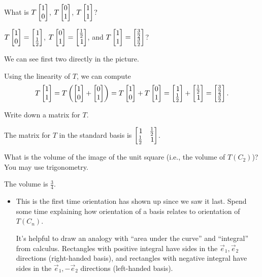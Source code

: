 \documentclass{problemset}
\newcommand{\bookonlynewpage}{\begin{bookonly}\newpage\end{bookonly}}
\begin{document}
	\begin{parts}
		\item What is $T\mat{1\\0}$, $T\mat{0\\1}$, $T\mat{1\\1}$?
			\begin{solution}
				$T\mat{1\\0}=\mat{1\\\frac{1}{2}}$,
				$T\mat{0\\1}=\mat{\frac{1}{2}\\1}$, and
				$T\mat{1\\1}=\mat{\frac{3}{2}\\\frac{3}{2}}$?

				We can see first two directly in the picture.

				Using the linearity of $T$, we can compute
				\[
					T\mat{1\\1}
					=T\left(\mat{1\\0}+\mat{0\\1}\right)
					=T\mat{1\\0}+T\mat{0\\1}
					=\mat{1\\\frac{1}{2}}+\mat{\frac{1}{2}\\1}
					=\mat{\frac{3}{2}\\\frac{3}{2}}.
				\]

			\end{solution}
		\item Write down a matrix for $T$.
			\begin{solution}
				The matrix for $T$ in the standard basis is
				$\mat{1&\frac{1}{2}\\\frac{1}{2}&1}$.
			\end{solution}
		\item What is the volume of the image of the unit square
			(i.e., the volume of $T(C_2)$)? You may use trigonometry.
			\begin{solution}
				The volume is $\frac{3}{4}$.
			\end{solution}
	\end{parts}

	\bookonlynewpage
	\begin{annotation}
		\begin{notes}
			\begin{itemize}
				\item This is the first time orientation has shown up since we saw it last. Spend some
					time explaining how orientation of a basis relates to orientation of $T(C_n)$.

					It's helpful to draw an analogy with ``area under the curve'' and ``integral'' 
					from calculus. Rectangles with positive integral have sides in the $\vec e_1,\vec e_2$
					directions (right-handed basis), and rectangles with negative integral
					have sides in the $\vec e_1,-\vec e_2$ directions (left-handed basis).
			\end{itemize}
		\end{notes}
	\end{annotation}
\end{document}
